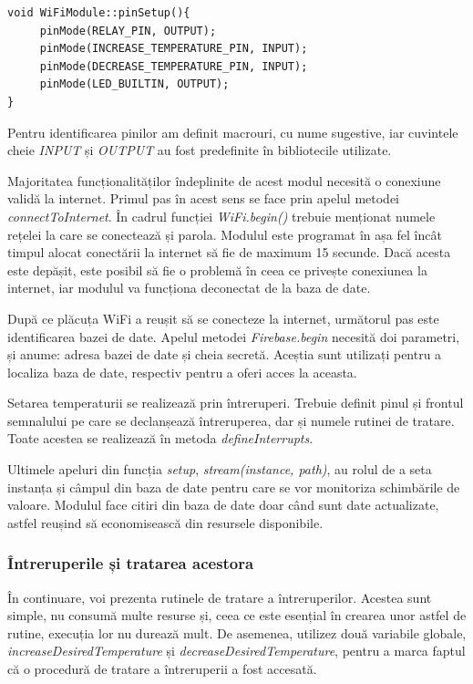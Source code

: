 \vspace{1em}

\begin{lstlisting}
void WiFiModule::pinSetup(){
     pinMode(RELAY_PIN, OUTPUT);
     pinMode(INCREASE_TEMPERATURE_PIN, INPUT);
     pinMode(DECREASE_TEMPERATURE_PIN, INPUT);
     pinMode(LED_BUILTIN, OUTPUT);
}
\end{lstlisting}

\vspace{2em}	

	Pentru identificarea pinilor am definit macrouri, cu nume sugestive, iar cuvintele cheie \textit{INPUT} și \textit{OUTPUT} au fost predefinite în bibliotecile utilizate.

	Majoritatea funcționalităților îndeplinite de acest modul necesită o conexiune validă la internet. Primul pas în acest sens se face prin apelul metodei \textit{connectToInternet}. În cadrul funcției \textit{WiFi.begin()} trebuie menționat numele rețelei la care se conectează și parola. Modulul este programat în așa fel încât timpul alocat conectării la internet să fie de maximum 15 secunde. Dacă acesta este depășit, este posibil să fie o problemă în ceea ce privește conexiunea la internet, iar modulul va funcționa deconectat de la baza de date.
 
	După ce plăcuța WiFi a reușit să se conecteze la internet, următorul pas este identificarea bazei de date. Apelul metodei \textit{Firebase.begin} necesită doi parametri, și anume: adresa bazei de date și cheia secretă. Aceștia sunt utilizați pentru a localiza baza de date, respectiv pentru a oferi acces la aceasta.

	Setarea temperaturii se realizează prin întreruperi. Trebuie definit pinul și frontul semnalului pe care se declanșează întreruperea, dar și numele rutinei de tratare. Toate acestea se realizează în metoda \textit{defineInterrupts}.

	Ultimele apeluri din funcția \textit{setup}, \textit{stream(instance, path)}, au rolul de a seta instanța și câmpul din baza de date pentru care se vor monitoriza schimbările de valoare. Modulul face citiri din baza de date doar când sunt date actualizate, astfel reușind să economisească din resursele disponibile.

\subsubsection{Întreruperile și tratarea acestora}

	În continuare, voi prezenta rutinele de tratare a întreruperilor. Acestea sunt simple, nu consumă multe resurse și, ceea ce este esențial în crearea unor astfel de rutine, execuția lor nu durează mult. De asemenea, utilizez două variabile globale, \textit{increaseDesiredTemperature} și \textit{decreaseDesiredTemperature}, pentru a marca faptul că o procedură de tratare a întreruperii a fost accesată.

